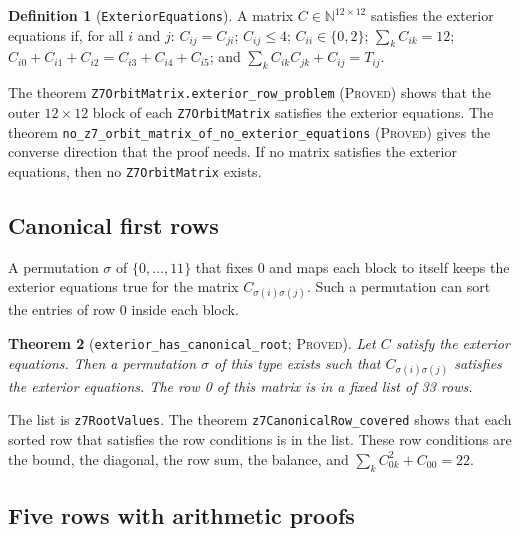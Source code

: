 \documentclass{article}
\theoremstyle{plain}
\newtheorem{theorem}{Theorem}[section]
\theoremstyle{definition}
\newtheorem{definition}[theorem]{Definition}
\numberwithin{equation}{section}
\begin{document}
\begin{definition}[\texttt{ExteriorEquations}]
A matrix $C \in \mathbb{N}^{12 \times 12}$ satisfies the exterior equations if, for all $i$ and $j$:
$C_{ij} = C_{ji}$; $C_{ij} \le 4$; $C_{ii} \in \{0, 2\}$; $\sum_k C_{ik} = 12$; $C_{i0} + C_{i1} + C_{i2} = C_{i3} + C_{i4} + C_{i5}$; and $\sum_k C_{ik} C_{jk} + C_{ij} = T_{ij}$.
\end{definition}

The theorem \texttt{Z7OrbitMatrix.exterior\_row\_problem} (\textsc{Proved}) shows that the outer $12 \times 12$ block of each \texttt{Z7OrbitMatrix} satisfies the exterior equations.
The theorem \texttt{no\_z7\_orbit\_matrix\_of\_no\_exterior\_equations} (\textsc{Proved}) gives the converse direction that the proof needs. If no matrix satisfies the exterior equations, then no \texttt{Z7OrbitMatrix} exists.

\subsection{Canonical first rows}

A permutation $\sigma$ of $\{0, \dots, 11\}$ that fixes 0 and maps each block to itself keeps the exterior equations true for the matrix $C_{\sigma(i)\sigma(j)}$.
Such a permutation can sort the entries of row 0 inside each block.

\begin{theorem}[\texttt{exterior\_has\_canonical\_root}; \textsc{Proved}]
Let $C$ satisfy the exterior equations. Then a permutation $\sigma$ of this type exists such that $C_{\sigma(i)\sigma(j)}$ satisfies the exterior equations. The row 0 of this matrix is in a fixed list of 33 rows.
\end{theorem}

The list is \texttt{z7RootValues}. The theorem \texttt{z7CanonicalRow\_covered} shows that each sorted row that satisfies the row conditions is in the list. These row conditions are the bound, the diagonal, the row sum, the balance, and $\sum_k C_{0k}^2 + C_{00} = 22$.

\subsection{Five rows with arithmetic proofs}
\end{document}
